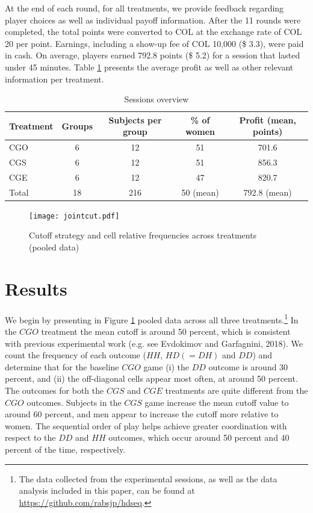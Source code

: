 \documentclass[12pt,english]{article}
\begin{document}
At the end of each round, for all treatments, we provide feedback regarding player choices as well as individual payoff information. After the 11 rounds were completed, the total points were converted to COL at the exchange rate of COL 20 per point. Earnings, including a show-up fee of COL 10,000 (\$ 3.3), were paid in cash. On average, players earned 792.8 points (\$ 5.2) for a session that lasted under 45 minutes. Table \ref{session} presents the average profit as well as other relevant information per treatment. 

\begin{table}[ht]
\centering
\caption{Sessions overview }
\hline
\begin{tabular}{lcccc}
  Treatment & Groups & Subjects per group & \% of women & Profit (mean, points)\\
  \hline  
  CGO & 6 & 12 & 51 & 701.6 \\
  CGS & 6 & 12 & 51 & 856.3 \\
  CGE & 6 & 12 & 47 & 820.7 \\
\hline
Total & 18 & 216 &  50 (mean) & 792.8 (mean)\\
\end{tabular}

\label{session}
\end{table}

\begin{center}
\begin{figure}[ht]
\centering{}%
\texttt{[image: jointcut.pdf]}%
\caption{Cutoff strategy and cell relative frequencies across treatments (pooled data)} 
\label{fig:cutpooled}
\end{figure}
\par\end{center}


\section{Results}
\label{sec:results}

We begin by presenting in Figure \ref{fig:cutpooled} pooled data across all three treatments.\footnote{The data collected from the experimental sessions, as well as the data analysis included in this paper, can be found at \url{https://github.com/rabsjp/hdseq}.} In the $CGO$ treatment the mean cutoff is around 50 percent, which is consistent with previous experimental work (e.g. see Evdokimov and Garfagnini, 2018). We count the frequency of each outcome ($HH$, $HD (=DH)$ and $DD$) and determine that for the baseline $CGO$ game (i) the $DD$ outcome is around 30 percent, and (ii) the off-diagonal cells appear most often, at around 50 percent. The outcomes for both the $CGS$ and $CGE$ treatments are quite different from the $CGO$ outcomes. Subjects in the $CGS$ game increase the mean cutoff value to around 60 percent, and men appear to increase the cutoff more relative to women. The sequential order of play helps achieve greater coordination with respect to the $DD$ and $HH$ outcomes, which occur around 50 percent and 40 percent of the time, respectively. 
\end{document}
